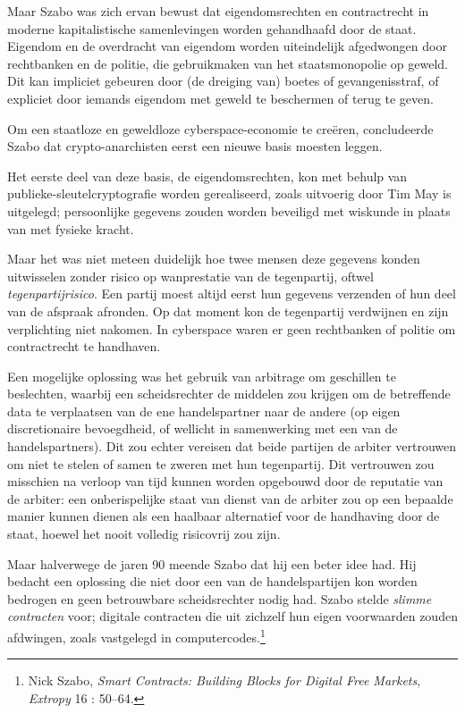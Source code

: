 \documentclass[
  a5paper,
  smalldemyvopaper,11pt,twoside,onecolumn,openright,extrafontsizes,
hidelinks]{memoir}
\begin{document}
Maar Szabo was zich ervan bewust dat eigendomsrechten en contractrecht
in moderne kapitalistische samenlevingen worden gehandhaafd door de
staat. Eigendom en de overdracht van eigendom worden uiteindelijk
afgedwongen door rechtbanken en de politie, die gebruikmaken van het
staatsmonopolie op geweld. Dit kan impliciet gebeuren door (de dreiging
van) boetes of gevangenisstraf, of expliciet door iemands eigendom met
geweld te beschermen of terug te geven.

Om een staatloze en geweldloze cyberspace-economie te creëren,
concludeerde Szabo dat crypto-anarchisten eerst een nieuwe basis moesten
leggen.

Het eerste deel van deze basis, de eigendomsrechten, kon met behulp van
publieke-sleutelcryptografie worden gerealiseerd, zoals uitvoerig door
Tim May is uitgelegd; persoonlijke gegevens zouden worden beveiligd met
wiskunde in plaats van met fysieke kracht.

Maar het was niet meteen duidelijk hoe twee mensen deze gegevens konden
uitwisselen zonder risico op wanprestatie van de tegenpartij, oftwel
\emph{tegenpartijrisico}. Een partij moest altijd eerst hun gegevens
verzenden of hun deel van de afspraak afronden. Op dat moment kon de
tegenpartij verdwijnen en zijn verplichting niet nakomen. In cyberspace
waren er geen rechtbanken of politie om contractrecht te handhaven.

Een mogelijke oplossing was het gebruik van arbitrage om geschillen te
beslechten, waarbij een scheidsrechter de middelen zou krijgen om de
betreffende data te verplaatsen van de ene handelspartner naar de andere
(op eigen discretionaire bevoegdheid, of wellicht in samenwerking met
een van de handelspartners). Dit zou echter vereisen dat beide partijen
de arbiter vertrouwen om niet te stelen of samen te zweren met hun
tegenpartij. Dit vertrouwen zou misschien na verloop van tijd kunnen
worden opgebouwd door de reputatie van de arbiter: een onberispelijke
staat van dienst van de arbiter zou op een bepaalde manier kunnen dienen
als een haalbaar alternatief voor de handhaving door de staat, hoewel
het nooit volledig risicovrij zou zijn.

Maar halverwege de jaren 90 meende Szabo dat hij een beter idee had. Hij
bedacht een oplossing die niet door een van de handelspartijen kon
worden bedrogen en geen betrouwbare scheidsrechter nodig had. Szabo
stelde \emph{slimme contracten} voor; digitale contracten die uit
zichzelf hun eigen voorwaarden zouden afdwingen, zoals vastgelegd in
computercodes.\footnote{Nick Szabo, \emph{Smart Contracts: Building
  Blocks for Digital Free Markets}, \emph{Extropy} 16 : 50--64.}
\end{document}
